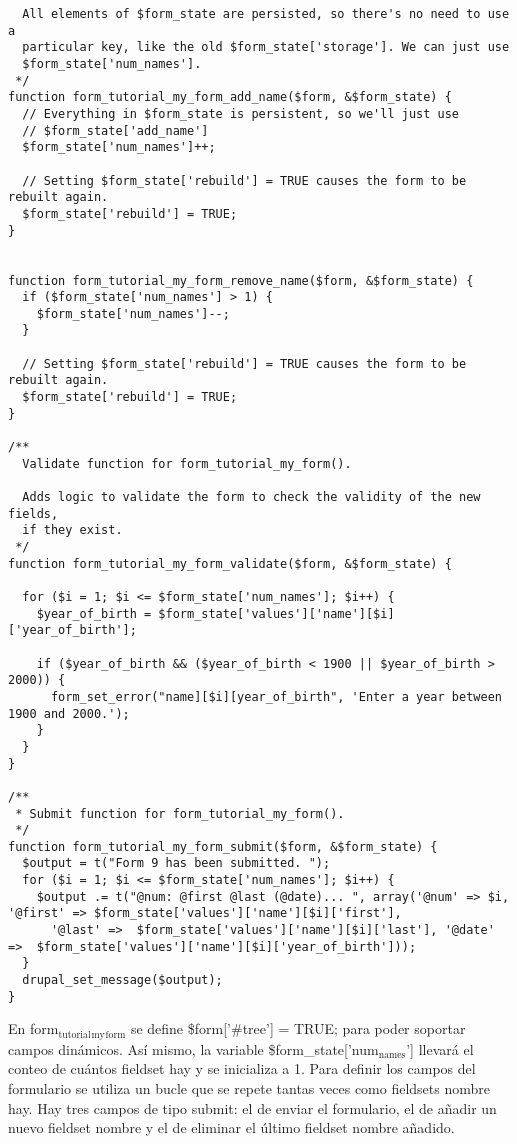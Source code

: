 \documentclass[11pt]{article}
\begin{document}
\begin{verbatim}
  All elements of $form_state are persisted, so there's no need to use a
  particular key, like the old $form_state['storage']. We can just use
  $form_state['num_names'].
 */
function form_tutorial_my_form_add_name($form, &$form_state) {
  // Everything in $form_state is persistent, so we'll just use
  // $form_state['add_name']
  $form_state['num_names']++;

  // Setting $form_state['rebuild'] = TRUE causes the form to be rebuilt again.
  $form_state['rebuild'] = TRUE;
}


function form_tutorial_my_form_remove_name($form, &$form_state) {
  if ($form_state['num_names'] > 1) {
    $form_state['num_names']--;
  }

  // Setting $form_state['rebuild'] = TRUE causes the form to be rebuilt again.
  $form_state['rebuild'] = TRUE;
}

/**
  Validate function for form_tutorial_my_form().
 
  Adds logic to validate the form to check the validity of the new fields,
  if they exist.
 */
function form_tutorial_my_form_validate($form, &$form_state) {

  for ($i = 1; $i <= $form_state['num_names']; $i++) {
    $year_of_birth = $form_state['values']['name'][$i]['year_of_birth'];

    if ($year_of_birth && ($year_of_birth < 1900 || $year_of_birth > 2000)) {
      form_set_error("name][$i][year_of_birth", 'Enter a year between 1900 and 2000.');
    }
  }
}

/**
 * Submit function for form_tutorial_my_form().
 */
function form_tutorial_my_form_submit($form, &$form_state) {
  $output = t("Form 9 has been submitted. ");
  for ($i = 1; $i <= $form_state['num_names']; $i++) {
    $output .= t("@num: @first @last (@date)... ", array('@num' => $i, '@first' => $form_state['values']['name'][$i]['first'],
      '@last' =>  $form_state['values']['name'][$i]['last'], '@date' =>  $form_state['values']['name'][$i]['year_of_birth']));
  }
  drupal_set_message($output);
}
\end{verbatim}



En form$_{\mathrm{tutorial}}$$_{\mathrm{my}}$$_{\mathrm{form}}$ se define \$form['\#tree'] = TRUE; para poder
soportar campos dinámicos. Así mismo, la variable
\$form\_state['num$_{\mathrm{names}}$'] llevará el conteo de cuántos fieldset hay y
se inicializa a 1. Para definir los campos del formulario se utiliza
un bucle que se repete tantas veces como fieldsets nombre hay. Hay
tres campos de tipo submit: el de enviar el formulario, el de añadir
un nuevo fieldset nombre y el de eliminar el último fieldset nombre
añadido.
\end{document}
